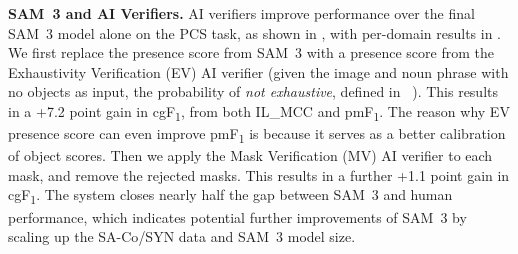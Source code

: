 \documentclass[]{fairmeta}
\newcommand{\model}{SAM~3\xspace}
\newcommand{\task}{PCS\xspace}
\newcommand{\dsname}{{SA-Co}\xspace}
\newcommand{\trainsyn}{{\dsname/SYN}\xspace}
\newcommand{\cgf}{cgF\textsubscript{1}\xspace}
\newcommand{\pmf}{pmF\textsubscript{1}\xspace}
\newcommand{\ilmcc}{IL\_MCC\xspace}
\renewcommand{\paragraph}[1]{%
	\noindent\textbf{#1.}\noindent\xspace%
}
\begin{document}
\paragraph{\model and AI Verifiers} AI verifiers improve performance over the final \model model alone on the \task task, as shown in , with per-domain results in . We first replace the presence score from \model with a presence score from the Exhaustivity Verification (EV) AI verifier (given the image and noun phrase with no objects as input, the probability of \textit{not exhaustive}, defined in ~). This results in a +7.2 point gain in \cgf, from both \ilmcc and \pmf. The reason why EV presence score can even improve \pmf is because it serves as a better calibration of object scores. Then we apply the Mask Verification (MV) AI verifier to each mask, and remove the rejected masks. This results in a further +1.1 point gain in \cgf. The system closes nearly half the gap between \model and human performance, which indicates potential further improvements of \model by scaling up the \trainsyn data and \model model size. 
\end{document}
